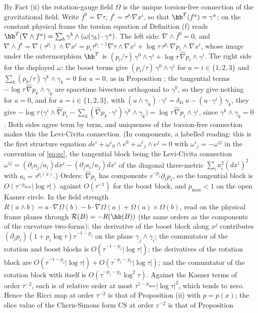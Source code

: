 By Fact (ii) the rotation-gauge field $\Omega$ is the unique torsion-free connection of the gravitational field. Write $f^0 = \nabla\tau$, $f^i = \tau^{p_i}\nabla x^i$, so that $\hb^{T}(f^a) = \gamma^a$; on the constant physical frame the torsion equation of Definition (f) reads $\hb^{T}(\nabla\wedge f^a) = \sum_b \gamma^b\wedge(\omega(\gamma_b)\cdot\gamma^a)$. The left side: $\nabla\wedge f^0 = 0$, and $\nabla\wedge f^i = \nabla(\tau^{p_i})\wedge\nabla x^i = p_i\tau^{p_i-1}\nabla\tau\wedge\nabla x^i + \log\tau\,\tau^{p_i}\,\nabla p_i\wedge\nabla x^i$, whose image under the outermorphism $\hb^{T}$ is $(p_i/\tau)\,\gamma^0\wedge\gamma^i + \log\tau\,\hat\nabla p_i\wedge\gamma^i$. The right side for the displayed $\omega$: the boost terms give $(p_i/\tau)\,\gamma^0\wedge\gamma^i$ for $a = i \in \{1, 2, 3\}$ and $\sum_k(p_k/\tau)\,\gamma^k\wedge\gamma_k = 0$ for $a = 0$, as in Proposition ; the tangential terms $-\log\tau\,\hat\nabla p_k\wedge\gamma_k$ are spacetime bivectors orthogonal to $\gamma^0$, so they give nothing for $a = 0$, and for $a = i \in \{1, 2, 3\}$, with $(u\wedge\gamma_k)\cdot\gamma^i = \delta_{ki}\,u - (u\cdot\gamma^i)\,\gamma_k$, they give $-\log\tau\,\bigl(\gamma^i\wedge\hat\nabla p_i - \sum_k(\hat\nabla p_k\cdot\gamma^i)\,\gamma^k\wedge\gamma_k\bigr) = \log\tau\,\hat\nabla p_i\wedge\gamma^i$, since $\gamma^k\wedge\gamma_k = 0$. Both sides agree term by term, and uniqueness of the torsion-free connection makes this the Levi-Civita connection. (In components, a labelled reading: this is the first structure equation $de^i + \omega^{i}{}_{0}\wedge e^0 + \omega^{i}{}_{j}\wedge e^j = 0$ with $\omega^{i}{}_{j} = -\omega^{ij}$ in the convention of \eqref{eq:ec}, the tangential block being the Levi-Civita connection $\omega^{ij} = (\partial_i a_j/a_i)dx^j - (\partial_j a_i/a_j)dx^i$ of the diagonal three-metric $\sum_i a_i^2(dx^i)^2$ with $a_i = \tau^{p_i(x)}$.) Orders: $\hat\nabla p_i$ has components $\tau^{-p_j}\partial_j p_i$, so the tangential block is $O(\tau^{-p_{\max}}|\log\tau|)$ against $O(\tau^{-1})$ for the boost block, and $p_{\max} < 1$ on the open Kasner circle. In the field strength $R(a\wedge b) = a\cdot\nabla\Omega(b) - b\cdot\nabla\Omega(a) + \Omega(a)\times\Omega(b)$, read on the physical frame planes through $\mathcal{R}(B) = -R(\hb(B))$ (the same orders as the components of the curvature two-forms): the derivative of the boost block along $x^j$ contributes $(\partial_jp_i)(1 + p_i\log\tau)\tau^{-1-p_j}$ on the plane $\gamma_j\wedge\gamma_i$; the commutator of the rotation and boost blocks is $O(\tau^{-1-p_j}|\log\tau|)$; the derivatives of the rotation block are $O(\tau^{-1-p_j}|\log\tau|) + O(\tau^{-p_j-p_k}|\log\tau|)$; and the commutator of the rotation block with itself is $O(\tau^{-p_j-p_k}\log^2\tau)$. Against the Kasner terms of order $\tau^{-2}$, each is of relative order at most $\tau^{1-p_{\max}}|\log\tau|^2$, which tends to zero. Hence the Ricci map at order $\tau^{-2}$ is that of Proposition (ii) with $p = p(x)$; the slice value of the Chern-Simons form $\mathrm{CS}$ at order $\varepsilon^{-2}$ is that of Proposition 